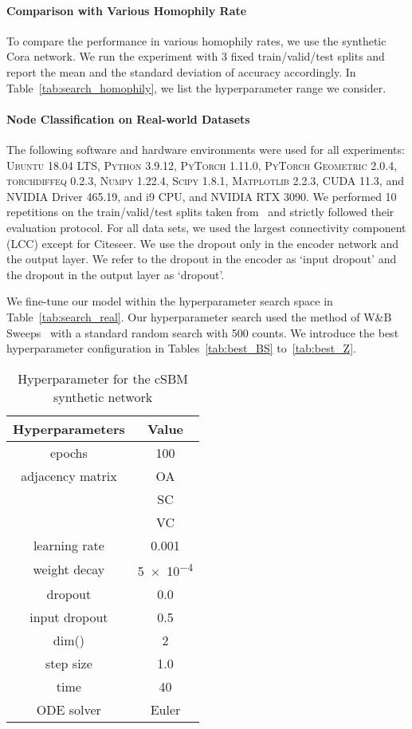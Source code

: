 \documentclass{article}
\theoremstyle{plain}
\theoremstyle{definition}
\theoremstyle{remark}
\begin{document}
\paragraph{Comparison with Various Homophily Rate}
To compare the performance in various homophily rates, we use the synthetic Cora network. We run the experiment with 3 fixed train/valid/test splits and report the mean and the standard deviation of accuracy accordingly. In Table~\ref{tab:search_homophily}, we list the hyperparameter range we consider.

\paragraph{Node Classification on Real-world Datasets}
The following software and hardware environments were used for all experiments: \textsc{Ubuntu} 18.04 LTS, \textsc{Python} 3.9.12,  \textsc{PyTorch} 1.11.0, \textsc{PyTorch Geometric} 2.0.4, \textsc{torchdiffeq} 0.2.3, \textsc{Numpy} 1.22.4, \textsc{Scipy} 1.8.1, \textsc{Matplotlib} 2.2.3, \textsc{CUDA} 11.3, and \textsc{NVIDIA} Driver 465.19, and i9 CPU, and \textsc{NVIDIA RTX 3090}.  We performed 10 repetitions on the train/valid/test splits taken from~\cite{pei2020geomGCN} and strictly followed their evaluation protocol. For all data sets, we used the largest connectivity component (LCC) except for Citeseer. We use the dropout only in the encoder network and the output layer. We refer to the dropout in the encoder as `input dropout' and  the dropout in the output layer as `dropout'. 


We fine-tune our model within the hyperparameter search space in Table~\ref{tab:search_real}. Our hyperparameter search used the method of W\&B Sweeps~\cite{wandb2020} with a standard random search with 500 counts. We introduce the best hyperparameter configuration in Tables~\ref{tab:best_BS} to~\ref{tab:best_Z}.

\begin{table}[ht!]
    \centering
    \caption{Hyperparameter for the cSBM synthetic network}
    \begin{tabular}{cc} \toprule
        Hyperparameters  &  Value \\ \midrule
        epochs           & 100 \\
        adjacency matrix & OA \\
                 & SC \\
                  & VC \\
        learning rate    & 0.001\\
        weight decay     & \num{5e-4}\\
        dropout          & 0.0\\
        input dropout    & 0.5\\
        dim()& 2\\
        step size  & 1.0\\
        time          & 40 \\
        ODE solver       & Euler\\
        \bottomrule
    \end{tabular}
    \label{tab:hyperparams_energy}
\end{table}
\end{document}
